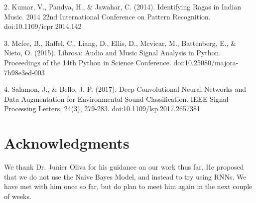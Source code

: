 \documentclass{article}
\begin{document}
2. Kumar, V., Pandya, H., \& Jawahar, C. (2014). Identifying Ragas in Indian Music. 2014 22nd International Conference on Pattern Recognition. doi:10.1109/icpr.2014.142

3. Mcfee, B., Raffel, C., Liang, D., Ellis, D., Mcvicar, M., Battenberg, E., \& Nieto, O. (2015). Librosa: Audio and Music Signal Analysis in Python. Proceedings of the 14th Python in Science Conference. doi:10.25080/majora-7b98e3ed-003

4. Salamon, J., \& Bello, J. P. (2017). Deep Convolutional Neural Networks and Data Augmentation for Environmental Sound Classification. IEEE Signal Processing Letters, 24(3), 279-283. doi:10.1109/lsp.2017.2657381


\section*{Acknowledgments} 

We thank Dr. Junier Oliva for his guidance on our work thus far. He proposed that we do not use the Naive Bayes Model, and instead to try using RNNs. We have met with him once so far, but do plan to meet him again in the next couple of weeks.



\end{document}
